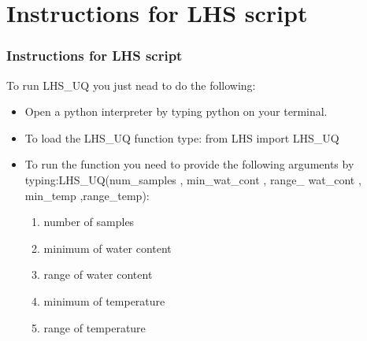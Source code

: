\documentclass[10pt]{beamer}
\begin{document}
\section{Instructions for LHS script}
\begin{frame}
\frametitle{Instructions for LHS script}
To run LHS\_UQ you just nead to do the following:
 \begin{itemize}
 
 \item Open a python interpreter by typing python on your terminal.
 
 \item To load the LHS\_UQ function type: from LHS import LHS\_UQ 
 
 \item To run the function you need to provide the following arguments by typing:\newline LHS\_UQ(num\_samples , min\_wat\_cont , range\_ wat\_cont , min\_temp ,range\_temp):
   \begin{enumerate}
 \item number of samples
 \item minimum of water content
 \item range of water content
 \item minimum of temperature
 \item range of temperature
 \end{enumerate}

 \end{itemize}

\end{frame}
\end{document}
